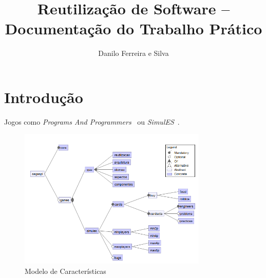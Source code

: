 \documentclass[11pt]{article}
\title{Reutilização de Software -- Documentação do Trabalho Prático}
\author{Danilo Ferreira e Silva\inst{1}}
\begin{document}
 

\maketitle



\section{Introdução}

Jogos como \emph{Programs And Programmers}~\cite{baker2005pnp} ou \emph{SimulES}~\cite{figueiredo2007simules}.


\begin{figure}[htb]
\centering
\includegraphics[width=0.8\textwidth]{img/features.png}
\caption{Modelo de Características}
\label{img:feature-model}
\end{figure}








\end{document}
